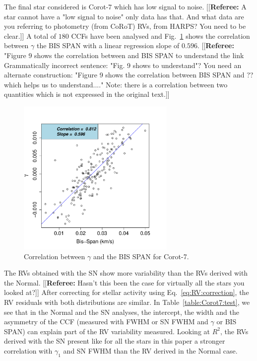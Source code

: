 \documentclass[11pt, oneside]{article}
\newcommand{\comment}[1]{{\color{red}[[\textbf{Referee: }#1]]}}
\begin{document}
The final star considered is Corot-7 which has low signal to noise. 
\comment{A star cannot have a "low signal to noise" only data has that. And what data are you referring to photometry (from CoRoT) RVs, from HARPS? You need to be clear.}
A total of $180$ CCFs have been analysed and Fig.~\ref{fig:Corot7:corr.gamma} shows the correlation between $\gamma$ the BIS SPAN with a linear regression slope of $0.596$.
\comment{"Figure 9 shows the correlation between and BIS SPAN to understand the link Grammatically incorrect sentence: "Fig. 9 shows to understand"?
You need an alternate construction: "Figure 9 shows the correlation between BIS SPAN and ?? which helps us to understand...."
Note: there is a correlation between two quantities which is not expressed in the original text.}
%
\begin{figure}[htbp]
   \centering
\includegraphics[height = 3in]{LRa01_E_[2]gamma_vs_bisspan.pdf} 
   \caption{Correlation between $\gamma$ and the BIS SPAN for Corot-7.}
   \label{fig:Corot7:corr.gamma}
\end{figure}

The RVs obtained with the SN show more variability than the RVs derived with the Normal. 
\comment{Hasn't this been the case for virtually all the stars you looked at?}
After correcting for stellar activity using Eq.~\ref{eq:RV:correction}, the RV residuals with both distributions are similar. In Table~\ref{table:Corot7:test}, we see that in the Normal and the SN analyses, the intercept, the width and the asymmetry of the CCF (measured with FWHM or SN FWHM and $\gamma$ or BIS SPAN) can explain part of the RV variability measured. Looking at $R^2$, the RVs derived with the SN present like for all the stars in this paper a stronger correlation with $\gamma_1$ and SN FWHM than the RV derived in the Normal case.
\end{document}
